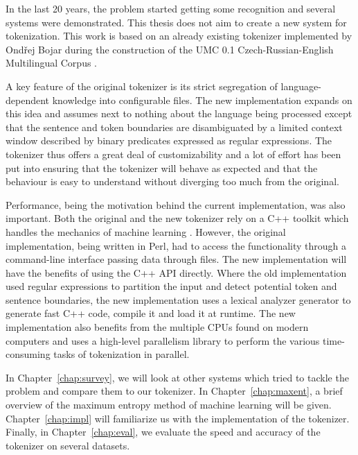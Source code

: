 In the last 20 years, the problem started getting some recognition and several
systems were demonstrated. This thesis does not aim to create a new system for
tokenization. This work is based on an already existing tokenizer implemented
by Ondřej Bojar during the construction of the UMC 0.1 Czech-Russian-English
Multilingual Corpus \cite{maxent-original-paper,maxent-original}.

A key feature of the original tokenizer is its strict segregation of
language-dependent knowledge into configurable files. The new implementation
expands on this idea and assumes next to nothing about the language being
processed except that the sentence and token boundaries are disambiguated by a
limited context window described by binary predicates expressed as regular
expressions. The tokenizer thus offers a great deal of customizability and a
lot of effort has been put into ensuring that the tokenizer will behave as
expected and that the behaviour is easy to understand without diverging too
much from the original.

Performance, being the motivation behind the current implementation, was also
important. Both the original and the new tokenizer rely on a C++ toolkit which
handles the mechanics of machine learning \cite{maxent-toolkit}. However, the
original implementation, being written in Perl, had to access the functionality
through a command-line interface passing data through files. The new
implementation will have the benefits of using the C++ API directly. Where the
old implementation used regular expressions to partition the input and detect
potential token and sentence boundaries, the new implementation uses a lexical
analyzer generator \cite{web-quex} to generate fast C++ code, compile it and
load it at runtime. The new implementation also benefits from the multiple CPUs
found on modern computers and uses a high-level parallelism library
\cite{web-tbb} to perform the various time-consuming tasks of tokenization in
parallel.

In Chapter~\ref{chap:survey}, we will look at other systems which tried to
tackle the problem and compare them to our tokenizer. In
Chapter~\ref{chap:maxent}, a brief overview of the maximum entropy method of
machine learning will be given. Chapter~\ref{chap:impl} will familiarize us
with the implementation of the tokenizer. Finally, in Chapter~\ref{chap:eval},
we evaluate the speed and accuracy of the tokenizer on several datasets.
